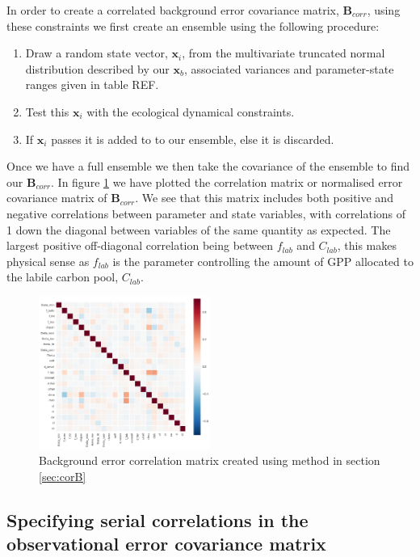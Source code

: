 \documentclass[11pt]{article}
\begin{document}
In order to create a correlated background error covariance matrix, $\textbf{B}_{corr}$, using these constraints we first create an ensemble using the following procedure:
\begin{enumerate}
\item Draw a random state vector, $\textbf{x}_i$, from the multivariate truncated normal distribution described by our $\textbf{x}_b$, associated variances and parameter-state ranges given in table REF.
\item Test this $\textbf{x}_i$ with the ecological dynamical constraints.
\item If $\textbf{x}_i$ passes it is added to to our ensemble, else it is discarded.
\end{enumerate}
Once we have a full ensemble we then take the covariance of the ensemble to find our $\textbf{B}_{corr}$. In figure \ref{fig:Bcorr} we have plotted the correlation matrix or normalised error covariance matrix of $\textbf{B}_{corr}$. We see that this matrix includes both positive and negative correlations between parameter and state variables, with correlations of 1 down the diagonal between variables of the same quantity as expected. The largest positive off-diagonal correlation being between $f_{lab}$ and $C_{lab}$, this makes physical sense as $f_{lab}$ is the parameter controlling the amount of GPP allocated to the labile carbon pool, $C_{lab}$.

\begin{figure}[ht]
    \centering
    \includegraphics[width=0.5\textwidth]{b_edcNone_corrmat.png}
    \caption{Background error correlation matrix created using method in section \ref{sec:corB}}
    \label{fig:Bcorr}
\end{figure}

\subsection{Specifying serial correlations in the observational error covariance matrix} \label{sec:corR}
\end{document}
